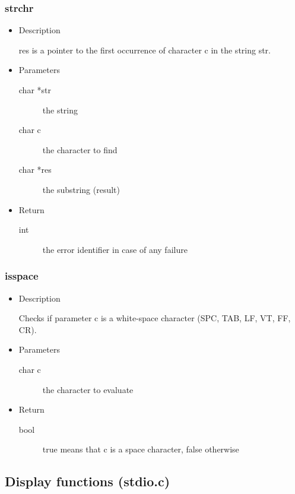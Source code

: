 \subsubsection{strchr}
\begin{itemize}
\item{Description}

	res is a pointer to the first occurrence of character c in the string str.
\item{Parameters}
	\begin{description}
	\item[char *str] the string
	\item[char c] the character to find
	\item[char *res] the substring (result)
	\end{description}
\item{Return}
	\begin{description}
	\item[int] the error identifier in case of any failure
	\end{description}
\end{itemize}

\subsubsection{isspace}
\begin{itemize}
\item{Description}

	Checks if parameter c is a white-space character (SPC, TAB, LF, VT, FF, CR).
\item{Parameters}
	\begin{description}
	\item[char c] the character to evaluate
	\end{description}
\item{Return}
	\begin{description}
	\item[bool] true means that c is a space character, false otherwise
	\end{description}
\end{itemize}

\subsection{Display functions (stdio.c)}

